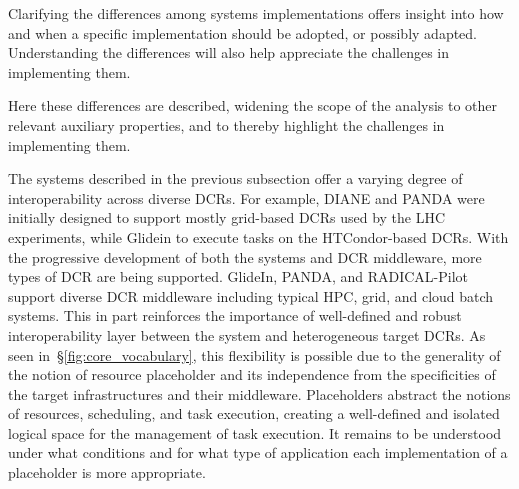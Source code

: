 \documentclass{sig-alternate}
\begin{document}

Clarifying the differences among \pilot systems implementations offers insight
into how and when a specific implementation should be adopted, or possibly
adapted. Understanding the differences will also help appreciate the challenges
in implementing them.

 Here these differences are described, widening the scope of
the analysis to other relevant auxiliary properties, and to thereby highlight
the challenges in implementing them.





The \pilot systems described in the previous subsection offer a varying degree
of interoperability across diverse DCRs. For example, DIANE and PANDA were
initially designed to support mostly grid-based DCRs used by the LHC
experiments, while Glidein to execute tasks on the HTCondor-based DCRs. With the
progressive development of both the \pilot systems and DCR middleware, more
types of DCR are being supported.  GlideIn, PANDA, and RADICAL-Pilot support
diverse DCR middleware including typical HPC, grid, and cloud batch systems.
This in part reinforces the importance of well-defined and robust
interoperability layer between the \pilot system and heterogeneous target DCRs.
As seen in~\S\ref{fig:core_vocabulary}, this flexibility is possible due to the
generality of the notion of resource placeholder and its independence from the
specificities of the target infrastructures and their middleware. Placeholders
abstract the notions of resources, scheduling, and task execution, creating a
well-defined and isolated logical space for the management of task execution.
It remains to be understood under what conditions and for what type of
application each implementation of a placeholder is more appropriate.
\end{document}
